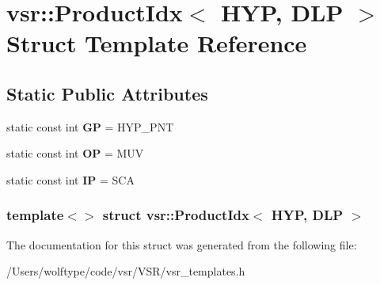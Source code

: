 \hypertarget{structvsr_1_1_product_idx_3_01_h_y_p_00_01_d_l_p_01_4}{\section{vsr\-:\-:Product\-Idx$<$ H\-Y\-P, D\-L\-P $>$ Struct Template Reference}
\label{structvsr_1_1_product_idx_3_01_h_y_p_00_01_d_l_p_01_4}
}
\subsection*{Static Public Attributes}
\begin{DoxyCompactItemize}
\item 
\hypertarget{structvsr_1_1_product_idx_3_01_h_y_p_00_01_d_l_p_01_4_accabd663b41b10ca2637fb773f0bbc6c}{static const int {\bfseries G\-P} = H\-Y\-P\-\_\-\-P\-N\-T}\label{structvsr_1_1_product_idx_3_01_h_y_p_00_01_d_l_p_01_4_accabd663b41b10ca2637fb773f0bbc6c}

\item 
\hypertarget{structvsr_1_1_product_idx_3_01_h_y_p_00_01_d_l_p_01_4_a1c585a8b8444b6d912cddfd4809c740f}{static const int {\bfseries O\-P} = M\-U\-V}\label{structvsr_1_1_product_idx_3_01_h_y_p_00_01_d_l_p_01_4_a1c585a8b8444b6d912cddfd4809c740f}

\item 
\hypertarget{structvsr_1_1_product_idx_3_01_h_y_p_00_01_d_l_p_01_4_a717af324a1e714cd559075ebafb5d467}{static const int {\bfseries I\-P} = S\-C\-A}\label{structvsr_1_1_product_idx_3_01_h_y_p_00_01_d_l_p_01_4_a717af324a1e714cd559075ebafb5d467}

\end{DoxyCompactItemize}
\subsubsection*{template$<$$>$ struct vsr\-::\-Product\-Idx$<$ H\-Y\-P, D\-L\-P $>$}



The documentation for this struct was generated from the following file\-:\begin{DoxyCompactItemize}
\item 
/\-Users/wolftype/code/vsr/\-V\-S\-R/vsr\-\_\-templates.\-h\end{DoxyCompactItemize}
